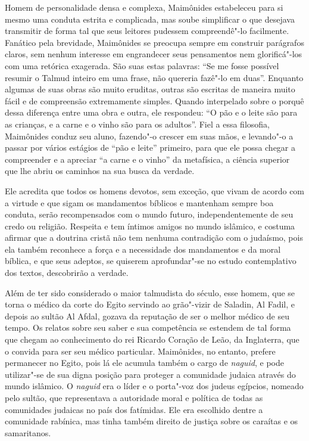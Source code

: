 Homem de personalidade densa e complexa, Maimônides estabeleceu para si
mesmo uma conduta estrita e complicada, mas soube simplificar o que
desejava transmitir de forma tal que seus leitores pudessem
compreendê"-lo facilmente. Fanático pela brevidade, Maimônides se
preocupa sempre em construir parágrafos claros, sem nenhum interesse em engrandecer 
seus pensamentos nem glorificá"-los com uma retórica exagerada. 
São suas estas palavras: ``Se me fosse possível resumir o Talmud inteiro em uma
frase, não quereria fazê"-lo em duas''. Enquanto algumas de suas obras
são muito eruditas, outras são escritas de maneira muito fácil e de
compreensão extremamente simples. Quando interpelado sobre o porquê
dessa diferença entre uma obra e outra, ele respondeu: ``O pão e o
leite são para as crianças, e a carne e o vinho são para os adultos''.
Fiel a essa filosofia, Maimônides conduz seu aluno, fazendo"-o crescer em
suas mãos, e levando"-o a passar por vários estágios de ``pão e leite''
primeiro, para que ele possa chegar a compreender e a apreciar ``a carne
e o vinho'' da metafísica, a ciência superior que lhe abriu os caminhos
na sua busca da verdade.

Ele acredita que todos os homens devotos, sem exceção, que vivam de
acordo com a virtude e que sigam os mandamentos bíblicos e mantenham
sempre boa conduta, serão recompensados com o mundo futuro,
independentemente de seu credo ou religião. Respeita e tem íntimos
amigos no mundo islâmico, e costuma afirmar que a doutrina cristã não
tem nenhuma contradição com o judaísmo, pois ela também reconhece a
força e a necessidade dos mandamentos e da moral bíblica, e que seus
adeptos, se quiserem aprofundar"-se no estudo contemplativo dos textos,
descobrirão a verdade.

Além de ter sido considerado o maior talmudista do século, esse homem,
que se torna o médico da corte do Egito servindo ao grão"-vizir de
Saladin, Al Fadil, e depois ao sultão Al Afdal, gozava da reputação de
ser o melhor médico de seu tempo. Os relatos sobre seu saber e sua
competência se estendem de tal forma que chegam ao conhecimento do rei
Ricardo Coração de Leão, da Inglaterra, que o convida para ser seu
médico particular. Maimônides, no entanto, prefere permanecer no Egito,
pois lá ele acumula também o cargo de \emph{naguid}, e pode utilizar"-se de sua
digna posição para proteger a comunidade judaica através do mundo
islâmico. O \emph{naguid} era o líder e o porta"-voz dos judeus egípcios,
nomeado pelo sultão, que representava a autoridade moral e política
de todas as comunidades judaicas no país dos fatímidas. Ele era escolhido
dentre a comunidade rabínica, mas tinha também direito de justiça sobre
os caraítas e os samaritanos.


